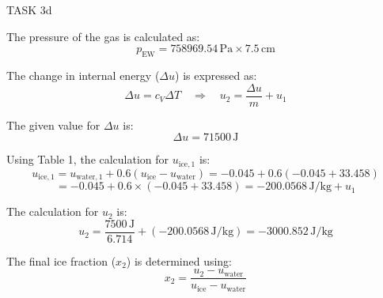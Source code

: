TASK 3d

The pressure of the gas is calculated as:
\[
p_{\text{EW}} = 758969.54 \, \text{Pa} \times 7.5 \, \text{cm}
\]

The change in internal energy (\( \Delta u \)) is expressed as:
\[
\Delta u = c_V \Delta T \quad \Rightarrow \quad u_2 = \frac{\Delta u}{m} + u_1
\]

The given value for \( \Delta u \) is:
\[
\Delta u = 71500 \, \text{J}
\]

Using Table 1, the calculation for \( u_{\text{ice},1} \) is:
\[
u_{\text{ice},1} = u_{\text{water},1} + 0.6 \left( u_{\text{ice}} - u_{\text{water}} \right) = -0.045 + 0.6 \left( -0.045 + 33.458 \right)
\]
\[
= -0.045 + 0.6 \times (-0.045 + 33.458) = -200.0568 \, \text{J/kg} + u_1
\]

The calculation for \( u_2 \) is:
\[
u_2 = \frac{7500 \, \text{J}}{6.714} + (-200.0568 \, \text{J/kg}) = -3000.852 \, \text{J/kg}
\]

The final ice fraction (\( x_2 \)) is determined using:
\[
x_2 = \frac{u_2 - u_{\text{water}}}{u_{\text{ice}} - u_{\text{water}}}
\]